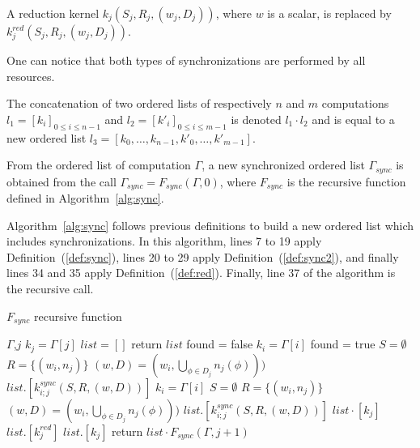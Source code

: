 \begin{mydef}
A reduction kernel $k_j(S_j,R_j,(w_j,D_j))$, where $w$ is a scalar, is replaced by $k^{red}_j(S_j,R_j,(w_j,D_j))$. %
\label{def:red}
\end{mydef}

One can notice that both types of synchronizations are performed by all resources.

\begin{mydef}
The concatenation of two ordered lists of respectively $n$ and $m$ computations $l_1=[k_i]_{0 \leq i \leq n-1}$ and $l_2=[k'_i]_{0 \leq i \leq m-1}$ is denoted $l_1 \cdot l_2$ and is equal to a new ordered list $l_3=[k_0,\dots,k_{n-1},k'_0,\dots,k'_{m-1}]$.
\end{mydef}

\begin{mydef}
From the ordered list of computation $\Gamma$, a new synchronized ordered list $\Gamma_{sync}$ is obtained from the call $\Gamma_{sync} = F_{sync}(\Gamma,0)$, where $F_{sync}$ is the recursive function defined in Algorithm~\ref{alg:sync}.
\end{mydef}

Algorithm~\ref{alg:sync} follows previous definitions to build a new ordered list which includes synchronizations. In this algorithm, lines 7 to 19 apply Definition~(\ref{def:sync}), lines 20 to 29 apply Definition~(\ref{def:sync2}), and finally lines 34 and 35 apply Definition~(\ref{def:red}). Finally, line 37 of the algorithm is the recursive call.

\begin{algorithm}
\caption{$F_{sync}$ recursive function}
\label{alg:sync}
\begin{algorithmic}[1]
 {$\Gamma$,$j$}
\State $k_j = \Gamma[j]$
\State $list = []$
\State return $list$
\State found = false
\State $k_i = \Gamma[i]$
\State found = true
\State $S = \emptyset$
\State $R = \{(w_i,n_j)\}$
\State $(w,D) = (w_i,\bigcup_{\phi \in D_j} n_j(\phi)))$
\State $list.[k_{i;j}^{sync}(S,R,(w,D))]$%
\EndIf
\EndFor
{}
\State $k_i = \Gamma[i]$
\State $S = \emptyset$
\State $R = \{(w_i,n_j)\}$
\State $(w,D) = (w_i,\bigcup_{\phi \in D_j} n_j(\phi)))$
\State $list.[k_{i;j}^{sync}(S,R,(w,D))]$%
\EndIf
\EndFor
\EndIf
\State $list \cdot [k_j]$
\EndFor
{}
\State $list.[k^{red}_j]$
\Else
\State $list.[k_j]$
\EndIf
\State return $list \cdot F_{sync}(\Gamma,j+1)$
\EndProcedure
\end{algorithmic}
\end{algorithm}


